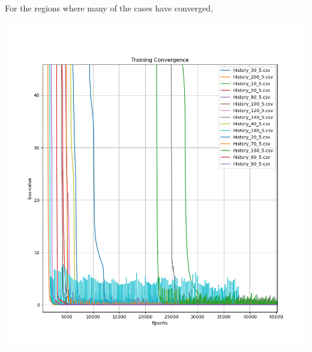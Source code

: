\documentclass[a4paper, 12pt]{report}
\def\size{0.75}
\begin{document}
\begin{center}
\newpage
For the regions where many of the cases have converged,
\\~\\\includegraphics[scale=\size]{Depth_5_Down.png}
\newpage

\end{center}
\end{document}
